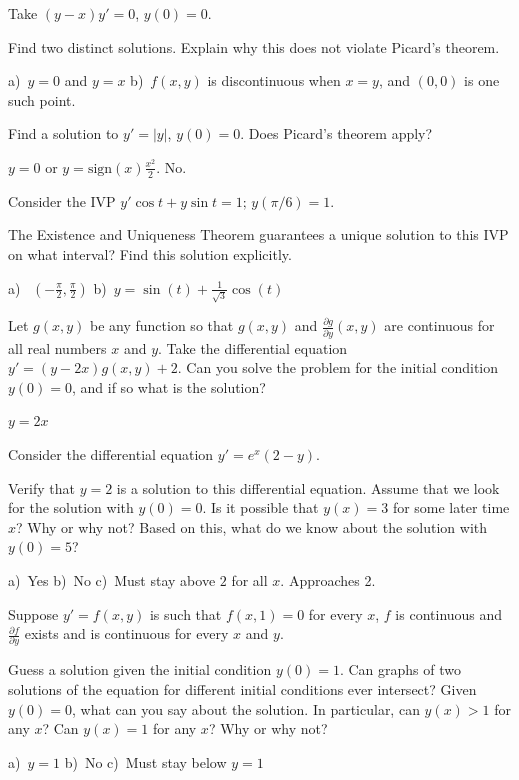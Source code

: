 \begin{exercise}[challenging]
Take $(y-x)y' = 0$, $y(0) = 0$.
\begin{tasks}
\task Find two distinct solutions.
\task Explain why this does not violate Picard's theorem.  
\end{tasks}
\end{exercise}
\comboSol{%
}
{%
a)~$y=0$ and $y=x$ \quad b)~$f(x,y)$ is discontinuous when $x=y$, and $(0,0)$ is one such point.
}

\begin{exercise}
Find a solution to $y' = \lvert y \rvert$, $y(0) = 0$.  Does Picard's theorem apply?
\end{exercise}
\comboSol{%
}
{%
$y=0$ or $y = \text{sign}(x)\frac{x^2}{2}$. No.
}

\begin{exercise}
Consider the IVP $y'\cos t+y\sin t=1; \, y(\pi/6)=1$.%
\begin{tasks}
\task The Existence and Uniqueness Theorem guarantees a unique solution to this IVP on what interval?
\task Find this solution explicitly.
\end{tasks}
\end{exercise}
\comboSol{%
}
{%
a)~ $\left(-\frac{\pi}{2}, \frac{\pi}{2}\right)$ \quad b)~$y = \sin(t) + \frac{1}{\sqrt{3}}\cos(t)$
}

\begin{exercise}
Let $g(x,y)$ be any function so that $g(x,y)$ and $\frac{\partial g}{\partial y}(x,y)$ are continuous for all real numbers $x$ and $y$. Take the differential equation $y' = (y-2x) g(x,y) + 2$.
Can you solve the problem for the
initial condition $y(0) = 0$,
and if so what is the solution?
\end{exercise}
\comboSol{%
}
{%
$y = 2x$
}

\begin{exercise}
Consider the differential equation $y' = e^x(2-y)$.
\begin{tasks}
\task Verify that $y = 2$ is a solution to this differential equation.
\task Assume that we look for the solution with $y(0) = 0$. Is it possible that $y(x) = 3$ for some later time $x$? Why or why not?
\task Based on this, what do we know about the solution with $y(0) = 5$?
\end{tasks}
\end{exercise}
\comboSol{%
}
{%
a)~Yes \quad b)~No \quad c)~Must stay above $2$ for all $x$. Approaches 2.
}

\begin{exercise}[challenging]
\pagebreak[2]
Suppose $y' = f(x,y)$ is such that $f(x,1) = 0$ for every $x$,
$f$ is continuous and $\frac{\partial f}{\partial y}$ exists and
is continuous for every $x$ and $y$.
\begin{tasks}
\task
Guess a solution given the initial condition
$y(0) = 1$.
\task
Can graphs of two solutions of the equation for different initial conditions
ever intersect?
\task
Given $y(0) = 0$, what can you say about the solution.  In particular,
can $y(x) > 1$ for any $x$?  Can $y(x) = 1$ for any $x$?  Why or why not?
\end{tasks}
\end{exercise}
\comboSol{%
}
{%
a)~$y=1$ \quad b)~No \quad c)~Must stay below $y=1$
}

